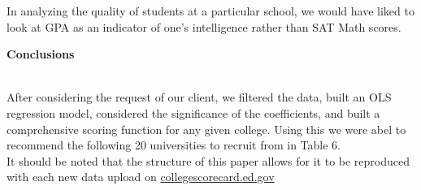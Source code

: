 \documentclass[11pt,english]{article}
\begin{document}
In analyzing the quality of students at a particular school, we would have liked to look at GPA as an indicator of one's intelligence rather than SAT Math scores.
\vspace*{3\baselineskip}


{\large\textbf{Conclusions}} \\\

After considering the request of our client, we filtered the data, built an OLS regression model, considered the significance of the coefficients, and built a comprehensive scoring function for any given college. Using this we were abel to recommend the following 20 universities to recruit from in Table 6.
\\
It should be noted that the structure of this paper allows for it to be reproduced with each new data upload on \href{https://collegescorecard.ed.gov/data}{collegescorecard.ed.gov}
\end{document}
